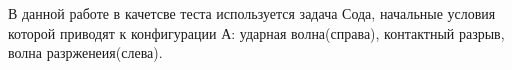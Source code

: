 \documentclass[a4paper,12pt]{extarticle}
\begin{document}
В данной работе в качетсве теста используется задача Сода, начальные условия которой приводят к конфигурации А: ударная волна(справа), контактный разрыв, волна разрженеия(слева).
\begin{figure}[h]
\begin{minipage}[h]{0.32\linewidth}
\end{minipage}
\hfill
\begin{minipage}[h]{0.32\linewidth}

\end{minipage}
\end{figure}
\end{document}
